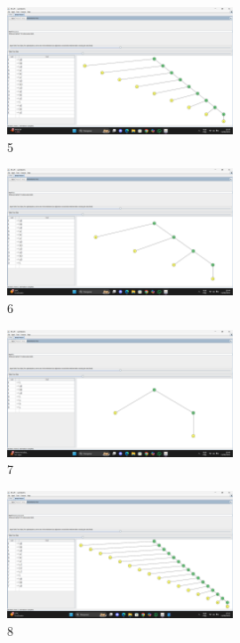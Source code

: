 \documentclass[a4paper,12pt]{article}
\begin{document}
    \begin{figure}[H]
        \centering
        \includegraphics[width=0.6\textwidth]{Aula03/Daniel/5.png}
        \caption*{5}
    \end{figure}
    \begin{figure}[H]
        \centering
        \includegraphics[width=0.6\textwidth]{Aula03/Daniel/6.png}
        \caption*{6}
    \end{figure}
    \begin{figure}[H]
        \centering
        \includegraphics[width=0.6\textwidth]{Aula03/Daniel/7.png}
        \caption*{7}
    \end{figure}
    \begin{figure}[H]
        \centering
        \includegraphics[width=0.6\textwidth]{Aula03/Daniel/8.png}
        \caption*{8}
    \end{figure}
\end{document}

